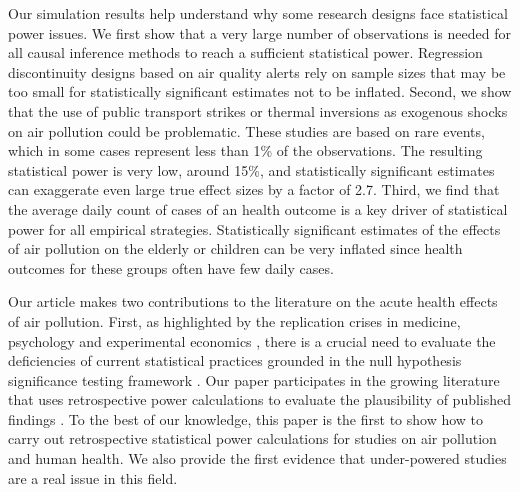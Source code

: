 \documentclass[12pt]{article}
\begin{document}
    Our simulation results help understand why some research designs face statistical power issues. We first show that a very large number of observations is needed for all causal inference methods to reach a sufficient statistical power. Regression discontinuity designs based on air quality alerts rely on sample sizes that may be too small for statistically significant estimates not to be inflated. Second, we show that the use of public transport strikes or thermal inversions as exogenous shocks on air pollution could be problematic. These studies are based on rare events, which in some cases represent less than 1\% of the observations. The resulting statistical power is very low, around 15\%, and statistically significant estimates can exaggerate even large true effect sizes by a factor of 2.7. Third, we find that the average daily count of cases of an health outcome is a key driver of statistical power for all empirical strategies. Statistically significant estimates of the effects of air pollution on the elderly or children can be very inflated since health outcomes for these groups often have few daily cases.

    Our article makes two contributions to the literature on the acute health effects of air pollution. First, as highlighted by the replication crises in medicine, psychology and experimental economics \citep{button2013power, open2015estimating, camerer2018evaluating}, there is a crucial need to evaluate the deficiencies of current statistical practices grounded in the null hypothesis significance testing framework \citep{ziliak2008cult, simonsohn2014p, smaldino2016natural, greenland2017invited, christensen2019transparent, amrhein2019statistical}. Our paper participates in the growing literature that uses retrospective power calculations to evaluate the plausibility of published findings \citep{ioannidis_why_2008, gelman_beyond_2014, smaldino2016natural, ioannidis_power_2017, ferraro_featureis_2020, stommes2021reliability}. To the best of our knowledge, this paper is the first to show how to carry out retrospective statistical power calculations for studies on air pollution and human health. We also provide the first evidence that under-powered studies are a real issue in this field.
    
\end{document}
